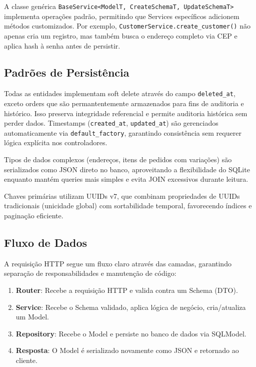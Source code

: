 A classe genérica \texttt{BaseService<ModelT, CreateSchemaT, UpdateSchemaT>} implementa operações padrão,
permitindo que Services específicos adicionem métodos customizados. Por exemplo, \texttt{CustomerService.create\_customer()}
não apenas cria um registro, mas também busca o endereço completo via CEP e aplica hash à senha antes de persistir.

\subsection{Padrões de Persistência}

\hspace{0.5cm} Todas as entidades implementam soft delete através do campo \texttt{deleted\_at}, exceto orders que são permantentemente armazenados para fins de auditoria e histórico.
Isso preserva integridade referencial e permite auditoria histórica sem perder dados. Timestamps (\texttt{created\_at}, \texttt{updated\_at}) são gerenciados automaticamente
via \texttt{default\_factory}, garantindo consistência sem requerer lógica explícita nos controladores.

Tipos de dados complexos (endereços, itens de pedidos com variações) são serializados como JSON direto no banco,
aproveitando a flexibilidade do SQLite enquanto mantém queries mais simples e evita JOIN excessivos durante leitura.

Chaves primárias utilizam UUIDs v7, que combinam propriedades de UUIDs tradicionais (unicidade global)
com sortabilidade temporal, favorecendo índices e paginação eficiente.

\subsection{Fluxo de Dados}

A requisição HTTP segue um fluxo claro através das camadas, garantindo separação de responsabilidades e manutenção de código:

\begin{enumerate}
  \item \textbf{Router}: Recebe a requisição HTTP e valida contra um Schema (DTO).
  \item \textbf{Service}: Recebe o Schema validado, aplica lógica de negócio, cria/atualiza um Model.
  \item \textbf{Repository}: Recebe o Model e persiste no banco de dados via SQLModel.
  \item \textbf{Resposta}: O Model é serializado novamente como JSON e retornado ao cliente.
\end{enumerate}

